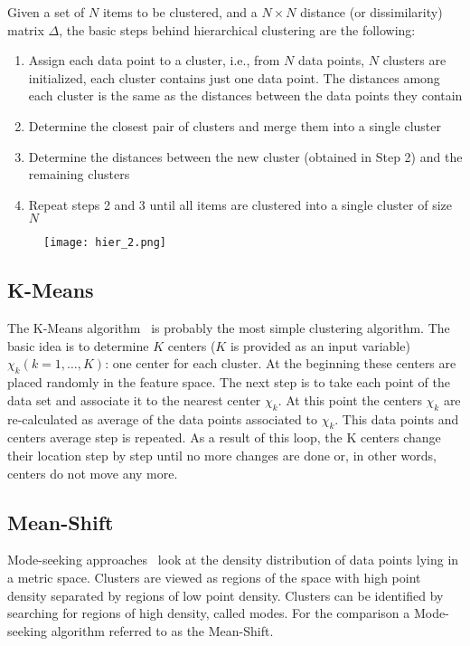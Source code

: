 Given a set of $N$ items to be clustered, and a $N \times N$ distance (or dissimilarity) matrix $\Delta$, 
the basic steps 
behind hierarchical clustering are the following:
\begin{enumerate}
  \item Assign each data point to a cluster, i.e., from $N$ data points, $N$ clusters are initialized, 
        each cluster contains just one data point. The distances among each cluster is the same as the
        distances between the data points they contain
  \item Determine the closest pair of clusters and merge them into a single cluster
  \item Determine the distances between the new cluster (obtained in Step 2) and the remaining clusters
  \item Repeat steps 2 and 3 until all items are clustered into a single cluster of size $N$
\end{enumerate}

\begin{figure}
    \centering
    \texttt{[image: hier\_2.png]}
    \caption{}
    \label{fig:2Danalogy}
\end{figure}
  
\subsection{K-Means}
\label{sec:kMeans}  
  
The K-Means algorithm~\cite{} is probably the most simple clustering algorithm. The basic idea is to 
determine $K$ centers ($K$ is provided as an input variable) $\chi_k (k=1,\ldots,K)$: one center for each cluster.
At the beginning these centers are placed randomly in the feature space. The  next  step is to take 
each point of the data set and associate it to the nearest center $\chi_k$. At this point the centers $\chi_k$ 
are re-calculated as average of the data points associated to $\chi_k$. This data points and centers average 
step is repeated. As a result of this loop, the K centers change their location step by step until no 
more changes are done or, in other words, centers do not move any more. 

\subsection{Mean-Shift}
\label{sec:meanShift}

Mode-seeking approaches~\cite{} look at the density distribution of data points lying in a metric space. 
Clusters are viewed as regions of the space with high point density separated by regions of low
point density. Clusters can be identified by searching for regions of high density, called modes. 
For the comparison a Mode-seeking algorithm referred to as the Mean-Shift.

